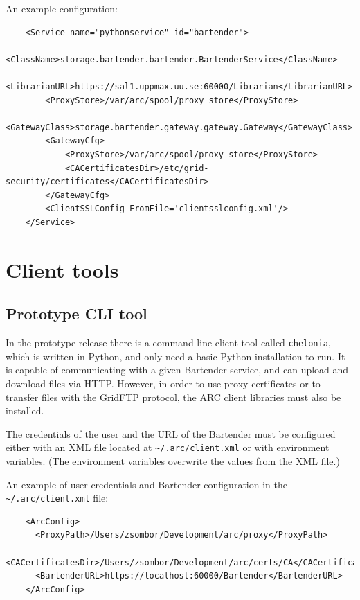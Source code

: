 \documentclass{book}
\begin{document}
An example configuration:

\begin{verbatim}
    <Service name="pythonservice" id="bartender">
        <ClassName>storage.bartender.bartender.BartenderService</ClassName>
        <LibrarianURL>https://sal1.uppmax.uu.se:60000/Librarian</LibrarianURL>
        <ProxyStore>/var/arc/spool/proxy_store</ProxyStore>
        <GatewayClass>storage.bartender.gateway.gateway.Gateway</GatewayClass>
        <GatewayCfg>
            <ProxyStore>/var/arc/spool/proxy_store</ProxyStore>
            <CACertificatesDir>/etc/grid-security/certificates</CACertificatesDir>
        </GatewayCfg>
        <ClientSSLConfig FromFile='clientsslconfig.xml'/>
    </Service>
\end{verbatim}


\newpage

\section{Client tools} %
\label{sec:client_tools}

\subsection{Prototype CLI tool} %
\label{sub:prototype_cli_tool}

In the prototype release there is a command-line client tool called \verb!chelonia!, which is written in Python, and only need a basic Python installation to run. It is capable of communicating with a given Bartender service, and can upload and download files via HTTP. However, in order to use proxy certificates or to transfer files with the GridFTP protocol, the ARC client libraries must also be installed.

The credentials of the user and the URL of the Bartender must be configured either with an XML file located at \verb!~/.arc/client.xml! or with environment variables. (The environment variables overwrite the values from the XML file.)

An example of user credentials and Bartender configuration in the \verb!~/.arc/client.xml! file:

\begin{verbatim}
    <ArcConfig>
      <ProxyPath>/Users/zsombor/Development/arc/proxy</ProxyPath>
      <CACertificatesDir>/Users/zsombor/Development/arc/certs/CA</CACertificatesDir>
      <BartenderURL>https://localhost:60000/Bartender</BartenderURL>
    </ArcConfig>
\end{verbatim}
\end{document}
